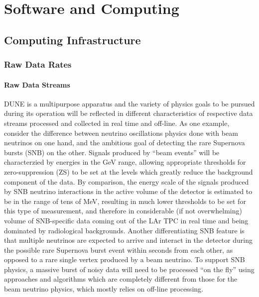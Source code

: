 \chapter{Software and Computing}
\label{ch:detectors-sc}

\section{Computing Infrastructure}
\label{sec:detectors-sc-infrastructure}

\subsection{Raw Data Rates}
\label{sec:detectors-sc-infrastructure-data-rates}



\subsubsection{Raw Data Streams}
DUNE is a multipurpose apparatus and the variety of physics goals to be pursued during its operation will
be reflected in different characteristics of respective data streams processed and collected in real time and off-line.
As one example, consider the difference between neutrino oscillations physics done with beam neutrinos on one hand,
and the ambitious goal of detecting the rare Supernova bursts (SNB) on the other. Signals produced by ``beam events'' will
be characterzied by energies in the GeV range, allowing appropriate thresholds for zero-suppression (ZS) to be
set at the levels which greatly reduce the background component of the data. By comparison, the energy scale of
the signals produced by SNB neutrino interactions in the active volume of the detector is estimated to be in the range of tens of MeV, resulting
in much lower thresholds to be set for this type of measurement, and therefore in considerable (if not overwhelming) volume of SNB-specific data coming
out of the LAr TPC in real time and being dominated by radiological backgrounds. Another differentiating SNB feature is that multiple neutrinos are expected
to arrive and interact in the detector during the possible rare Supernova burst event within seconds from each other, as opposed to a rare single vertex produced by a beam neutrino.
To support SNB physics, a massive burst of noisy data will need to be processed ``on the fly'' using approaches and
algorithms which are completely  different from those for the beam neutrino physics, which mostly relies on off-line processing.

